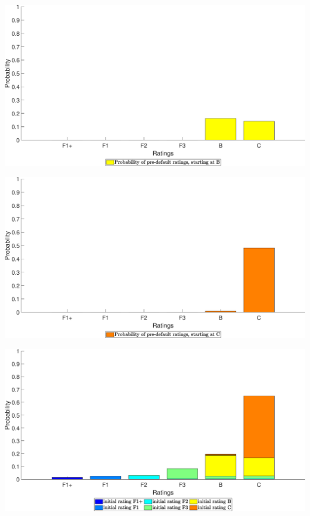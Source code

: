 \begin{landscape}
\includegraphics[width=.95\columnwidth]{PrePDQ/PrePDQ_FOBB_5}
\end{landscape}
\begin{landscape}
\includegraphics[width=.95\columnwidth]{PrePDQ/PrePDQ_FOBB_6}
\end{landscape}
\begin{landscape}
\includegraphics[width=.95\columnwidth]{PrePDQ/PrePDQ_FOBB_7}
\end{landscape}

